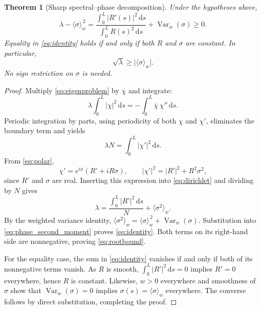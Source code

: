 \documentclass[11pt]{article}
\newtheorem{theorem}{Theorem}
\newcommand{\dd}{\,\mathrm{d}}
\newcommand{\avg}[1]{\langle #1\rangle_w}
\newcommand{\Var}{\operatorname{Var}}
\begin{document}
\begin{theorem}[Sharp spectral--phase decomposition]\label{thm:main}
Under the hypotheses above,
\begin{equation}\label{eq:identity}
    \boxed{
      \lambda-\avg{\sigma}^{\,2}
      =\frac{\displaystyle\int_0^L |R'(s)|^2\dd s}
             {\displaystyle\int_0^L R(s)^2\dd s}
       +\Var_w(\sigma)\ge0.
    }
\end{equation}
Equality in \eqref{eq:identity} holds if and only if both $R$ and
$\sigma$ are constant.  In particular,
\begin{equation}\label{eq:rootbound}
    \sqrt{\lambda}\ge\bigl|\avg{\sigma}\bigr|.
\end{equation}
No sign restriction on $\sigma$ is needed.
\end{theorem}

\begin{proof}
Multiply \eqref{eq:eigenproblem} by $\overline{\chi}$ and integrate:
\begin{equation}
    \lambda\int_0^L |\chi|^2\dd s
      =-\int_0^L\overline{\chi}\,\chi''\dd s.
\end{equation}
Periodic integration by parts, using periodicity of both $\chi$ and
$\chi'$, eliminates the boundary term and yields
\begin{equation}\label{eq:dirichlet}
    \lambda N=\int_0^L|\chi'|^2\dd s.
\end{equation}
From \eqref{eq:polar},
\begin{equation}
    \chi'=e^{i\phi}(R'+iR\sigma),
    \qquad
    |\chi'|^2=|R'|^2+R^2\sigma^2,
\end{equation}
since $R'$ and $\sigma$ are real.  Inserting this expression into
\eqref{eq:dirichlet} and dividing by $N$ gives
\begin{equation}\label{eq:phase_second_moment}
    \lambda
    =\frac{\int_0^L|R'|^2\dd s}{N}+\avg{\sigma^2}.
\end{equation}
By the weighted variance identity,
$\avg{\sigma^2}=\avg{\sigma}^{\,2}+\Var_w(\sigma)$.
Substitution into \eqref{eq:phase_second_moment} proves
\eqref{eq:identity}.  Both terms on its right-hand side are
nonnegative, proving \eqref{eq:rootbound}.

For the equality case, the sum in \eqref{eq:identity} vanishes if and
only if both of its nonnegative terms vanish.  As $R$ is smooth,
$\int_0^L|R'|^2\dd s=0$ implies $R'=0$ everywhere, hence $R$ is
constant.  Likewise, $w>0$ everywhere and smoothness of $\sigma$
show that $\Var_w(\sigma)=0$ implies
$\sigma(s)=\avg{\sigma}$ everywhere.  The converse follows by direct
substitution, completing the proof.
\end{proof}
\end{document}
